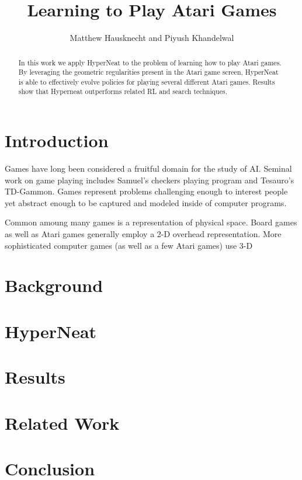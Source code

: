 \documentclass{article}
\begin{document}
\title{Learning to Play Atari Games}
\author{Matthew Hausknecht and Piyush Khandelwal}

\maketitle

\begin{abstract}
In this work we apply HyperNeat to the problem of learning how to play Atari games. By leveraging the geometric regularities present in the Atari game screen, HyperNeat is able to effectively evolve policies for playing several different Atari games. Results show that Hyperneat outperforms related RL and search techniques.
\end{abstract}

\section{Introduction}
Games have long been considered a fruitful domain for the study of AI. Seminal work on game playing includes Samuel's checkers playing program\cite{samuel_59} and Tesauro's TD-Gammon\cite{tesauro_94}. Games represent problems challenging enough to interest people yet abstract enough to be captured and modeled inside of computer programs. 

Common amoung many games is a representation of physical space. Board games as well as Atari games generally employ a 2-D overhead representation. More sophisticated computer games (as well as a few Atari games) use 3-D

\section{Background}

\section{HyperNeat}

\section{Results}

\section{Related Work}

\section{Conclusion}


	

\end{document}
